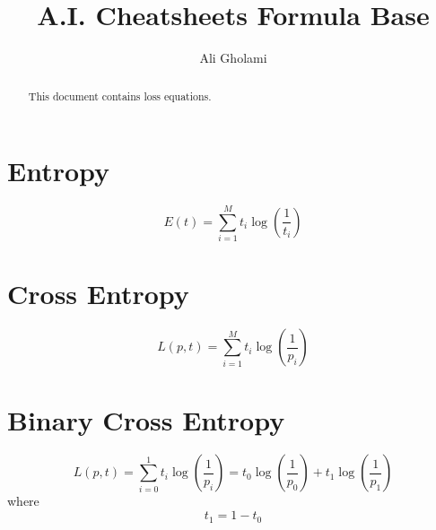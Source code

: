 \documentclass{article}
\begin{document}
\title{A.I. Cheatsheets Formula Base}
\author{Ali Gholami}

\maketitle

\begin{abstract}
This document contains loss equations.
\end{abstract}

\section{Entropy}

$$
E(t) = \sum_{i=1}^{M}t_i\log(\frac{1}{t_i})
$$


\section{Cross Entropy}

$$
    L(p, t) = \sum_{i=1}^{M} t_i \log(\frac{1}{p_i})
$$

\section{Binary Cross Entropy}

$$
    L(p, t) = \sum_{i=0}^{1} t_i \log(\frac{1}{p_i}) = t_0\log(\frac{1}{p_0}) + t_1\log(\frac{1}{p_1})
$$
where
$$
    t_1 = 1 - t_0
$$
\end{document}
